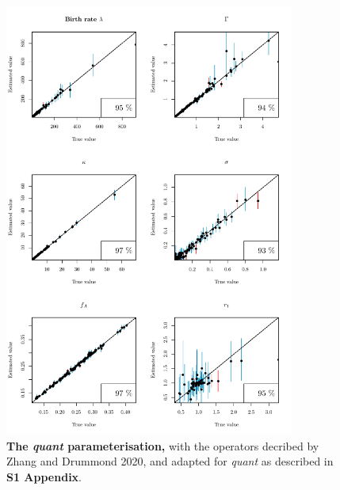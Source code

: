 \documentclass[12pt]{article}
\begin{document}
\begin{figure}[!htb]
\includegraphics[width=0.85\textwidth]{Figures/CalSim_quant.pdf}
\caption{\textbf{The \textit{quant} parameterisation,} with the operators decribed by Zhang and Drummond 2020, and adapted for \textit{quant} as described in \textbf{S1 Appendix}.}
\label{fig:rateparams}
\end{figure}





\end{document}

